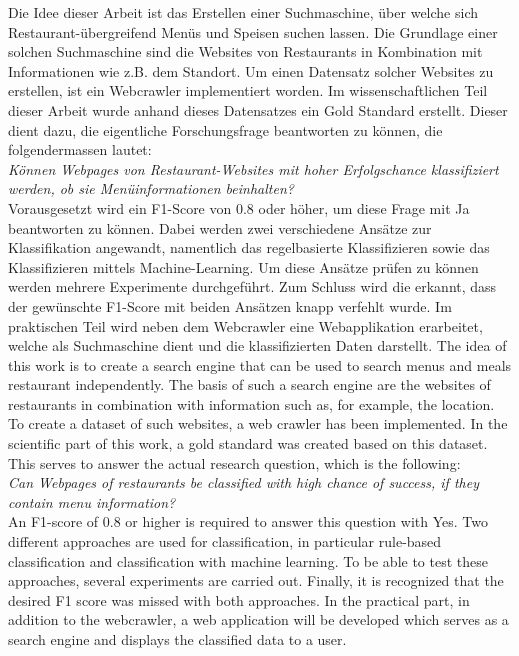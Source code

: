 Die Idee dieser Arbeit ist das Erstellen einer Suchmaschine, über welche sich Restaurant-übergreifend Menüs und Speisen suchen lassen.
Die Grundlage einer solchen Suchmaschine sind die Websites von Restaurants in Kombination mit Informationen wie z.B. dem Standort.
Um einen Datensatz solcher Websites zu erstellen, ist ein Webcrawler implementiert worden.
Im wissenschaftlichen Teil dieser Arbeit wurde anhand dieses Datensatzes ein Gold Standard erstellt.
Dieser dient dazu, die eigentliche Forschungsfrage beantworten zu können, die folgendermassen lautet:\\
\emph{Können Webpages von Restaurant-Websites mit hoher Erfolgschance klassifiziert werden, ob sie Menüinformationen beinhalten?}\\
Vorausgesetzt wird ein F1-Score von 0.8 oder höher, um diese Frage mit \glqq Ja\grqq{} beantworten zu können.
Dabei werden zwei verschiedene Ansätze zur Klassifikation angewandt, namentlich das regelbasierte Klassifizieren sowie das Klassifizieren mittels Machine-Learning.
Um diese Ansätze prüfen zu können werden mehrere Experimente durchgeführt.
Zum Schluss wird die erkannt, dass der gewünschte F1-Score mit beiden Ansätzen knapp verfehlt wurde.
Im praktischen Teil wird neben dem Webcrawler eine Webapplikation erarbeitet, welche als Suchmaschine dient und die klassifizierten Daten darstellt.
The idea of this work is to create a search engine that can be used to search menus and meals restaurant independently.
The basis of such a search engine are the websites of restaurants in combination with information such as, for example, the location.
To create a dataset of such websites, a web crawler has been implemented.
In the scientific part of this work, a gold standard was created based on this dataset.
This serves to answer the actual research question, which is the following: \\
\emph{Can Webpages of restaurants be classified with high chance of success, if they contain menu information?} \\
An F1-score of 0.8 or higher is required to answer this question with \glqq Yes\grqq{}.
Two different approaches are used for classification, in particular rule-based classification and classification with machine learning.
To be able to test these approaches, several experiments are carried out.
Finally, it is recognized that the desired F1 score was missed with both approaches.
In the practical part, in addition to the webcrawler, a web application will be developed which serves as a search engine and displays the classified data to a user.